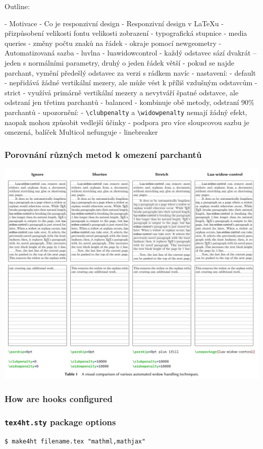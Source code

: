 
Outline:

- Motivace
- Co je responzivní design
- Responzivní design v LaTeXu
  - přizpůsobení velikosti fontu velikosti zobrazení
  - typografická stupnice
  - media queries
    - změny počtu znaků na řádek
    - okraje pomocí newgeometry
- Automatizovaná sazba
  - luvlna
  - luawidowcontrol
    - každý odstavec sází dvakrát -- jeden s normálními parametry, druhý o jeden řádek větší
    - pokud se najde parchant, vymění předešlý odstavec za verzi s rádkem navíc
    - nastavení:
      - default - nepřidává žádné vertikální mezery, ale může vést k příliš vzdušným odstavcům
      - strict - využívá primárně vertikální mezery a nevytváří špatné odstavce,  ale odstraní jen třetinu parchantů
      - balanced - kombinuje obě metody, odstraní 90\% parchantů
    - upozornění:
      - \verb|\clubpenalty| a \verb|\widowpenalty| nemají žádný efekt, naopak mohou způsobit vedlejší účinky
      - podpora pro více sloupcovou sazbu je omezená, balíček Multicol nefunguje
  - linebreaker

 
\begin{frame}
  \frametitle{Porovnání různých metod k omezení parchantů}
  \begin{center}
  \includegraphics[height=.95\textheight]{img/lua-widow.pdf}
  \end{center}
\end{frame}



\begin{frame}
  \frametitle{How are hooks configured}
  \begin{itemize}

\end{itemize}
\end{frame}

\begin{frame}[fragile]
  \frametitle{\texttt{tex4ht.sty} package options}
  \begin{priklad}
\begin{verbatim}
$ make4ht filename.tex "mathml,mathjax"
\end{verbatim}
\end{priklad}
\end{frame}
